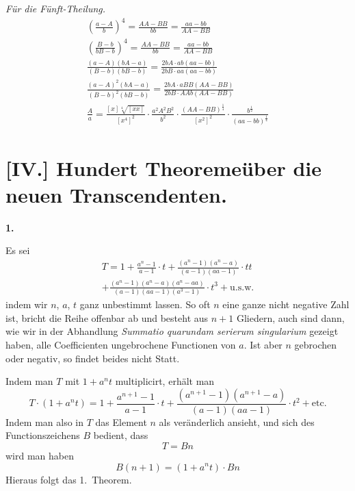 \documentclass[10pt,a4paper]{article}
\begin{document}
\textit{F\"ur die F\"unft-Theilung.}
%
\begin{gather*}
\left(\frac{a - A}{b}\right)^4 = \frac{AA - BB}{bb} = \frac{aa - bb}{AA - BB} \\
\left(\frac{B - b}{bB - b}\right)^4 = \frac{AA - BB}{bb} = \frac{aa - bb}{AA - BB} \\
\frac{(a - A)(bA - a)}{(B - b)(bB - b)} = \frac{2bA \cdot ab(aa - bb)}{2bB \cdot aa(aa - bb)} \\
\frac{(a - A)^2(bA - a)}{(B - b)^2(bB - b)} = \frac{2bA \cdot aBB(AA - BB)}{2bB \cdot AAb(AA - BB)} \\
\frac{A}{a} = \frac{[x] \sqrt[4]{[xx]}}{[x^4]^2} \cdot \frac{a^2 A^2 B^2}{b^2} \cdot \frac{(AA - BB)^{\frac{1}{4}}}{[x^2]^2} \cdot
\frac{b^{\frac{1}{2}}}{(aa - bb)^{\frac{1}{4}}}
\end{gather*}

\section*{[IV.] Hundert Theoreme\"uber die neuen Transcendenten.}

\textbf{1.}

Es sei
%
\begin{multline*}
T = 1 + \frac{a^n - 1}{a - 1} \cdot t + \frac{(a^n - 1)(a^n - a)}{(a - 1)(aa - 1)} \cdot tt \\
+ \frac{(a^n - 1)(a^n - a)(a^n - aa)}{(a - 1)(aa - 1)(a^3 - 1)} \cdot t^3
+ \text{u.s.w.}
\end{multline*}
%
indem wir $n$, $a$, $t$ ganz unbestimmt lassen. So oft $n$ eine ganze nicht negative Zahl ist, bricht die Reihe offenbar ab und besteht aus $n + 1$ Gliedern, auch sind dann, wie wir in der Abhandlung \textit{Summatio quarundam serierum singularium} gezeigt haben, alle Coefficienten ungebrochene Functionen von $a$. Ist aber $n$ gebrochen oder negativ, so findet beides nicht Statt.

Indem man $T$ mit $1 + a^n t$ multiplicirt, erh\"alt man
%
\begin{equation*}
T \cdot (1 + a^n t) = 1 + \frac{a^{n+1} - 1}{a - 1} \cdot t + \frac{(a^{n+1} - 1)(a^{n+1} - a)}{(a - 1)(aa - 1)} \cdot t^2 + \text{etc.}
\end{equation*}
%
Indem man also in $T$ das Element $n$ als ver\"anderlich ansieht, und sich des Functionszeichens $B$ bedient, dass
%
\begin{equation*}
T = Bn
\end{equation*}
%
wird man haben
%
\begin{equation*}
B(n+1) = (1 + a^n t) \cdot Bn
\end{equation*}
%
Hieraus folgt das 1.\ Theorem.
\end{document}
